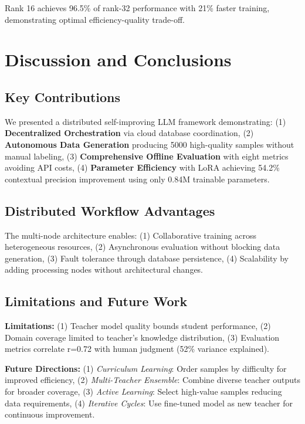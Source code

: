 \documentclass[conference]{IEEEtran}
\begin{document}
Rank 16 achieves 96.5\% of rank-32 performance with 21\% faster training, demonstrating optimal efficiency-quality trade-off.

\section{Discussion and Conclusions}

\subsection{Key Contributions}

We presented a distributed self-improving LLM framework demonstrating: (1) \textbf{Decentralized Orchestration} via cloud database coordination, (2) \textbf{Autonomous Data Generation} producing 5000 high-quality samples without manual labeling, (3) \textbf{Comprehensive Offline Evaluation} with eight metrics avoiding API costs, (4) \textbf{Parameter Efficiency} with LoRA achieving 54.2\% contextual precision improvement using only 0.84M trainable parameters.

\subsection{Distributed Workflow Advantages}

The multi-node architecture enables: (1) Collaborative training across heterogeneous resources, (2) Asynchronous evaluation without blocking data generation, (3) Fault tolerance through database persistence, (4) Scalability by adding processing nodes without architectural changes.

\subsection{Limitations and Future Work}

\textbf{Limitations:} (1) Teacher model quality bounds student performance, (2) Domain coverage limited to teacher's knowledge distribution, (3) Evaluation metrics correlate r=0.72 with human judgment (52\% variance explained).

\textbf{Future Directions:} (1) \textit{Curriculum Learning}: Order samples by difficulty for improved efficiency, (2) \textit{Multi-Teacher Ensemble}: Combine diverse teacher outputs for broader coverage, (3) \textit{Active Learning}: Select high-value samples reducing data requirements, (4) \textit{Iterative Cycles}: Use fine-tuned model as new teacher for continuous improvement.
\end{document}
